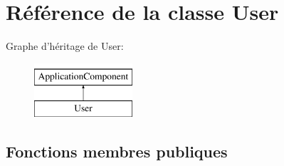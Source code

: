 \hypertarget{class_library_1_1_user}{\section{Référence de la classe User}
\label{class_library_1_1_user}
}
Graphe d'héritage de User\+:\begin{figure}[H]
\begin{center}
\leavevmode
\includegraphics[height=2.000000cm]{class_library_1_1_user}
\end{center}
\end{figure}
\subsection*{Fonctions membres publiques}
